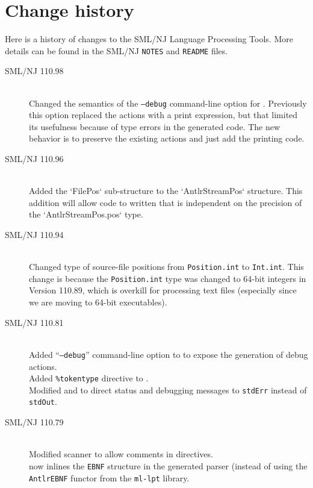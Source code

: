 %
\chapter{Change history}
\label{ch:history}

Here is a history of changes to the SML/NJ Language Processing Tools.
More details can be found in the SML/NJ \texttt{NOTES} and \texttt{README} files.
\begin{description}
  \item[SML/NJ 110.98]
    \mbox{}\\[0.5em]
    Changed the semantics of the \texttt{--debug} command-line option for \mlantlr{}.
    Previously this option replaced the actions with a print expression, but that
    limited its usefulness because of type errors in the generated code.  The new
    behavior is to preserve the existing actions and just add the printing code.
  \item[SML/NJ 110.96]
    \mbox{}\\[0.5em]
    Added the `FilePos` sub-structure to the `AntlrStreamPos` structure.  This
    addition will allow code to written that is independent on the precision
    of the `AntlrStreamPos.pos` type.
  \item[SML/NJ 110.94]
    \mbox{}\\[0.5em]
    Changed type of source-file positions from \texttt{Position.int} to \texttt{Int.int}.
    This change is because the \texttt{Position.int} type was changed to 64-bit integers
    in Version 110.89, which is overkill for processing text files (especially since
    we are moving to 64-bit executables).
  \item[SML/NJ 110.81]
    \mbox{}\\[0.5em]
    Added ``\texttt{--debug}'' command-line option to \mlantlr{} to expose the generation
    of debug actions.
    \\[0.5em]
    Added \texttt{\%tokentype} directive to \mlantlr{}.
    \\[0.5em]
    Modified \mlantlr{} and \ulex{} to direct status and debugging messages to
    \texttt{stdErr} instead of \texttt{stdOut}.
%
 \item[SML/NJ 110.79]
    \mbox{}\\[0.5em]
    Modified scanner to allow comments in \ulex{} directives.
    \\[0.5em]
    \mlantlr{} now inlines the \texttt{EBNF} structure in the generated parser (instead of using
    the \texttt{AntlrEBNF} functor from the \texttt{ml-lpt} library.

\end{description}
